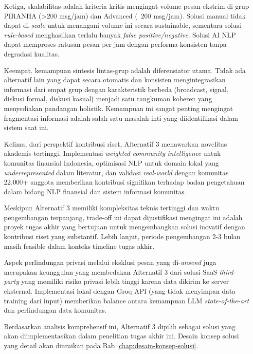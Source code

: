 Ketiga, skalabilitas adalah kriteria kritis mengingat volume pesan ekstrim di grup PIRANHA (>200 msg/jam) dan Advanced (~200 msg/jam). Solusi manual tidak dapat di-\textit{scale} untuk menangani volume ini secara sustainable, sementara solusi \textit{rule-based} menghasilkan terlalu banyak \textit{false positive/negative}. Solusi AI NLP dapat memproses ratusan pesan per jam dengan performa konsisten tanpa degradasi kualitas.

Keempat, kemampuan sintesis lintas-grup adalah diferensiator utama. Tidak ada alternatif lain yang dapat secara otomatis dan konsisten mengintegrasikan informasi dari empat grup dengan karakteristik berbeda (broadcast, signal, diskusi formal, diskusi kasual) menjadi satu rangkuman koheren yang menyediakan pandangan holistik. Kemampuan ini sangat penting mengingat fragmentasi informasi adalah salah satu masalah inti yang diidentifikasi dalam sistem saat ini.

Kelima, dari perspektif kontribusi riset, Alternatif 3 menawarkan novelitas akademis tertinggi. Implementasi \textit{weighted community intelligence} untuk komunitas finansial Indonesia, optimisasi NLP untuk domain lokal yang \textit{underrepresented} dalam literatur, dan validasi \textit{real-world} dengan komunitas 22.000+ anggota memberikan kontribusi signifikan terhadap badan pengetahuan dalam bidang NLP finansial dan sistem informasi komunitas.

Meskipun Alternatif 3 memiliki kompleksitas teknis tertinggi dan waktu pengembangan terpanjang, trade-off ini dapat dijustifikasi mengingat ini adalah proyek tugas akhir yang bertujuan untuk mengembangkan solusi inovatif dengan kontribusi riset yang substantif. Lebih lanjut, periode pengembangan 2-3 bulan masih feasible dalam konteks timeline tugas akhir.

Aspek perlindungan privasi melalui eksklusi pesan yang di-\textit{unsend} juga merupakan keunggulan yang membedakan Alternatif 3 dari solusi SaaS \textit{third-party} yang memiliki risiko privasi lebih tinggi karena data dikirim ke server eksternal. Implementasi lokal dengan Groq API (yang tidak menyimpan data training dari input) memberikan balance antara kemampuan LLM \textit{state-of-the-art} dan perlindungan data komunitas.

Berdasarkan analisis komprehensif ini, Alternatif 3 dipilih sebagai solusi yang akan diimplementasikan dalam penelitian tugas akhir ini. Desain konsep solusi yang detail akan diuraikan pada Bab \ref{chap:desain-konsep-solusi}.
